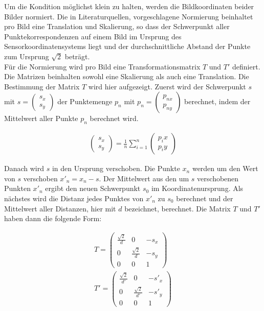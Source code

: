 Um die Kondition möglichst klein zu halten, werden die Bildkoordinaten beider Bilder normiert. Die in Literaturquellen, vorgeschlagene Normierung beinhaltet pro Bild eine Translation und Skalierung, so dass der Schwerpunkt aller Punktekorrespondenzen auf einem Bild im Ursprung des Sensorkoordinatensystems liegt und der durchschnittliche Abstand der Punkte zum Ursprung $\sqrt{2}$ beträgt\cite{HZ,Ferid,Brooks}.\\

Für die Normierung wird pro Bild eine Transformationsmatrix $T$ und $T'$ definiert. Die Matrizen beinhalten sowohl eine Skalierung als auch eine Translation. Die Bestimmung der Matrix $T$ wird hier aufgezeigt. Zuerst wird der Schwerpunkt $s$ mit $s=\begin{pmatrix}
s_x\\
s_y
\end{pmatrix}$ der Punktemenge $p_n$ mit $p_n = \begin{pmatrix}
p_{nx}\\
p_{ny}
\end{pmatrix}$ berechnet, indem der Mittelwert aller Punkte $p_n$ berechnet wird.

\begin{gather}
	\begin{pmatrix}
		s_x\\
		s_y
	\end{pmatrix} = \frac{1}{n} \sum_{i = 1}^{n} \begin{pmatrix}
	p_ix\\
	p_iy
\end{pmatrix}
\end{gather}

Danach wird $s$ in den Ursprung verschoben. Die Punkte $x_n$ werden um den Wert von $s$ verschoben $x'_n = x_n - s$. Der Mittelwert aus den um $s$ verschobenen Punkten $x'_n$ ergibt den neuen Schwerpunkt $s_0$ im Koordinatenursprung. Als nächstes wird die Distanz jedes Punktes von $x'_n$ zu $s_0$ berechnet und der Mittelwert aller Distanzen, hier mit $d$ bezeichnet, berechnet. Die Matrix $T$ und $T'$ haben dann die folgende Form:

\begin{gather}
	T = \begin{pmatrix}
		\frac{\sqrt{2}}{d}&0&-s_x\\
		0&\frac{\sqrt{2}}{d}&-s_y\\
		0&0&1
	\end{pmatrix}\\
	T' = \begin{pmatrix}
	\frac{\sqrt{2}}{d'}&0&-s'_x\\
	0&\frac{\sqrt{2}}{d'}&-s'_y\\
	0&0&1
\end{pmatrix}
\end{gather}

